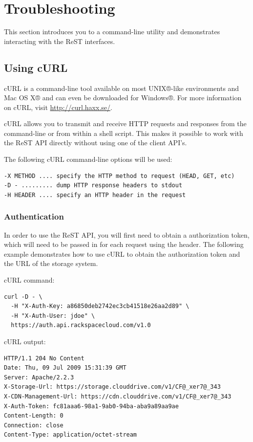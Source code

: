 \documentclass[letterpaper,10pt,english]{manual}
\begin{document}
\chapter{Troubleshooting}

This section introduces you to a command-line utility and demonstrates
interacting with the ReST interfaces.


\section{Using cURL}

cURL is a command-line tool available on most UNIX®-like environments and
Mac OS X® and can even be downloaded for Windows®.  For more information
on cURL, visit \href{http://curl.haxx.se/}{http://curl.haxx.se/}.

cURL allows you to transmit and receive HTTP requests and responses from
the command-line or from within a shell script. This makes it possible
to work with the ReST API directly without using one of the client API's.

The following cURL command-line options will be used:

\begin{Verbatim}[commandchars=@\[\]]
-X METHOD .... specify the HTTP method to request (HEAD, GET, etc)
-D - ......... dump HTTP response headers to stdout
-H HEADER .... specify an HTTP header in the request
\end{Verbatim}


\subsection{Authentication}

In order to use the ReST API, you will first need to obtain a
authorization token, which will need to be passed in for each request
using the  header. The following example demonstrates
how to use cURL to obtain the authorization token and the URL of the
storage system.

cURL command:

\begin{Verbatim}[commandchars=@\[\]]
curl -D - \
  -H "X-Auth-Key: a86850deb2742ec3cb41518e26aa2d89" \
  -H "X-Auth-User: jdoe" \
  https://auth.api.rackspacecloud.com/v1.0
\end{Verbatim}

cURL output:

\begin{Verbatim}[commandchars=@\[\]]
HTTP/1.1 204 No Content
Date: Thu, 09 Jul 2009 15:31:39 GMT
Server: Apache/2.2.3
X-Storage-Url: https://storage.clouddrive.com/v1/CF@_xer7@_343
X-CDN-Management-Url: https://cdn.clouddrive.com/v1/CF@_xer7@_343
X-Auth-Token: fc81aaa6-98a1-9ab0-94ba-aba9a89aa9ae
Content-Length: 0
Connection: close
Content-Type: application/octet-stream
\end{Verbatim}
\end{document}
